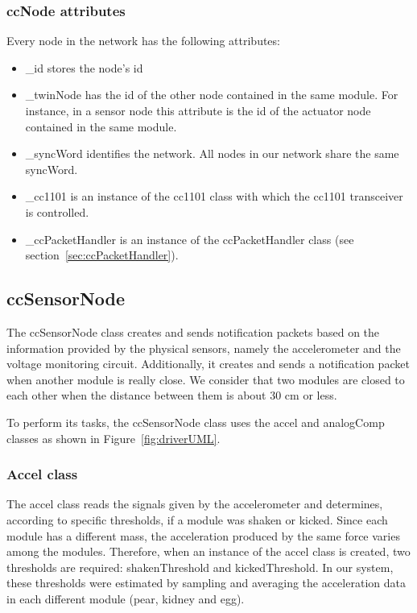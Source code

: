 \subsubsection{ccNode attributes}
\label{sec:ccNode-attributes}
Every node in the network has the following attributes:
\begin{itemize}
\item \_id stores the node's id
\item \_twinNode has the id of the other node contained in the same module. For instance, in a sensor node this attribute is the id of the actuator node contained in the same module.
\item \_syncWord identifies the network. All nodes in our network share the same syncWord.  
\item \_cc1101 is an instance of the cc1101 class with which the cc1101 transceiver is controlled.
\item \_ccPacketHandler is an instance of the ccPacketHandler class (see section~\ref{sec:ccPacketHandler}).
\end{itemize}
                        
\subsection{ccSensorNode}
The ccSensorNode class creates and sends notification packets based on the information provided by the physical sensors, namely the accelerometer and the voltage monitoring circuit. Additionally, it creates and sends a notification packet when another module is really close. We consider that two modules are closed to each other when the distance between them is about 30 cm or less.

To perform its tasks, the ccSensorNode class uses the accel and analogComp classes as shown in Figure~\ref{fig:driverUML}.

\subsubsection{Accel class}
\label{sec:Accel class}
The accel class reads the signals given by the accelerometer and determines, according to specific thresholds, if a module was shaken or kicked. Since each module has a different mass, the acceleration produced by the same force varies among the modules. Therefore, when an instance of the accel class is created, two thresholds are required: shakenThreshold and kickedThreshold. In our system, these thresholds were estimated by sampling and averaging the acceleration data in each different module (pear, kidney and egg).

